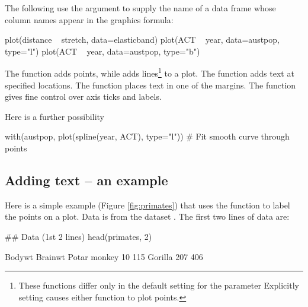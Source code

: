 The following use the argument  to supply the name of a
data frame whose column names appear in the graphics formula:
\begin{Schunk}
\begin{Sinput}
plot(distance ~ stretch, data=elasticband)
plot(ACT ~ year, data=austpop, type="l")
plot(ACT ~ year, data=austpop, type="b")
\end{Sinput}
\end{Schunk}

The  function adds points, while  adds
lines\footnote{These functions differ only in the default
  setting for the parameter   Explicitly setting
 causes either function to plot points.}  to a plot.
The  function adds text at specified locations.  The
 function places text in one of the margins.  The
 function gives fine control over axis ticks and labels.

Here is a further possibility
\begin{Schunk}
\begin{Sinput}
with(austpop, plot(spline(year, ACT), type="l"))
  # Fit smooth curve through points
\end{Sinput}
\end{Schunk}

\subsection*{Adding text -- an example}\label{ss:addpoints}
Here is a simple example (Figure \ref{fig:primates}) that uses the
function  to label the points on a plot. Data is from
the dataset .  The first two lines of
data are:
\begin{Schunk}
\begin{Sinput}
## Data (1st 2 lines)
head(primates, 2)
\end{Sinput}
\begin{Soutput}
             Bodywt Brainwt
Potar monkey     10     115
Gorilla         207     406
\end{Soutput}
\end{Schunk}

